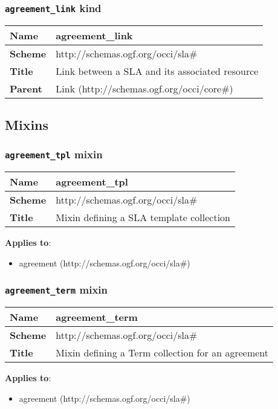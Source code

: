 \subsubsection{\texttt{agreement\_link} kind}
\begin{center}
\begin{tabular}{|l|l|}
  \hline
  \textbf{Name} & agreement\_link \\
  \hline  
  \textbf{Scheme} & http://schemas.ogf.org/occi/sla\# \\
  \hline
  \textbf{Title} & Link between a SLA and its associated resource \\
  \hline
  \textbf{Parent} & Link (http://schemas.ogf.org/occi/core\#) \\
  \hline
\end{tabular}
\end{center}


\subsection{Mixins}
\subsubsection{\texttt{agreement\_tpl} mixin}
\begin{center}
\begin{tabular}{|l|l|}
  \hline
  \textbf{Name} & agreement\_tpl \\
  \hline  
  \textbf{Scheme} & http://schemas.ogf.org/occi/sla\# \\
  \hline
  \textbf{Title} & Mixin defining a SLA template collection \\
  \hline
\end{tabular}
\end{center}
\textbf{Applies to}:
\begin{itemize}
	\item agreement (http://schemas.ogf.org/occi/sla\#)
\end{itemize}



\subsubsection{\texttt{agreement\_term} mixin}
\begin{center}
\begin{tabular}{|l|l|}
  \hline
  \textbf{Name} & agreement\_term \\
  \hline  
  \textbf{Scheme} & http://schemas.ogf.org/occi/sla\# \\
  \hline
  \textbf{Title} & Mixin defining a Term collection for an agreement \\
  \hline
\end{tabular}
\end{center}
\textbf{Applies to}:
\begin{itemize}
	\item agreement (http://schemas.ogf.org/occi/sla\#)
\end{itemize}


